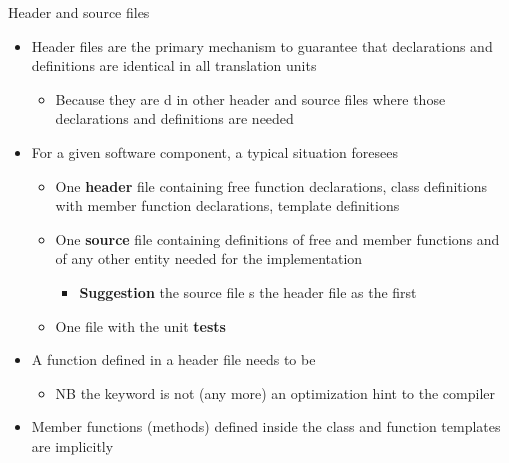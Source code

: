 \begin{frame}{Header and source files}

  \begin{itemize}[<+->]
  \item Header files are the primary mechanism to guarantee that declarations
    and definitions are identical in all translation units
    \begin{itemize}[<.->]
    \item Because they are d in other header and source files
      where those declarations and definitions are needed
    \end{itemize}
  \item For a given software component, a typical situation foresees
    \begin{itemize}
    \item One \textbf{header} file containing free function declarations, class
      definitions with member function declarations, template definitions
    \item One \textbf{source} file containing definitions of free and member functions
      and of any other entity needed for the implementation
      \begin{itemize}
      \item \textbf{Suggestion} the source file s the header
        file as the first 
      \end{itemize}
    \item One file with the unit \textbf{tests}
    \end{itemize}
  \item A function defined in a header file needs to be
    \begin{itemize}
    \item NB the  keyword is not (any more) an optimization hint to
      the compiler
    \end{itemize}
  \item Member functions (methods) defined inside the class and function
    templates are implicitly 
  \end{itemize}

\end{frame}

